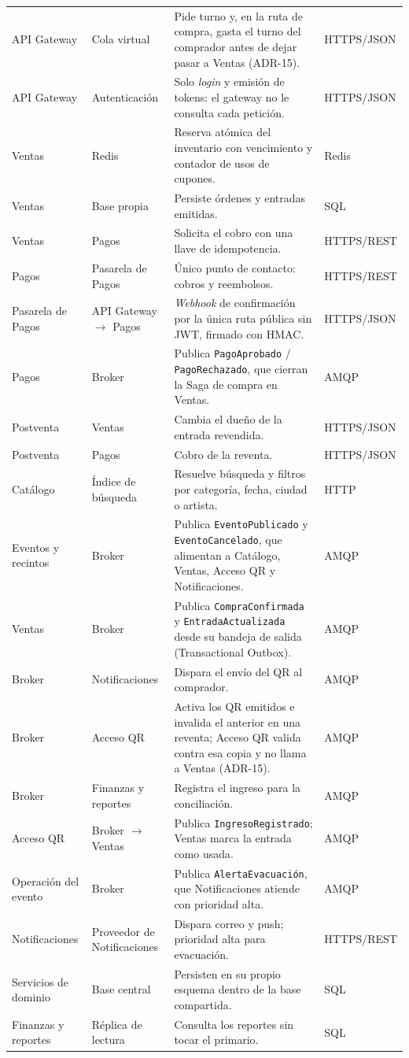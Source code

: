 \documentclass[12pt,a4paper]{article}
\begin{document}
\begin{longtable}{L{3.2cm}L{3.2cm}L{5.7cm}L{2.3cm}}
API Gateway & Cola virtual & Pide turno y, en la ruta de compra, gasta el turno del comprador antes de dejar pasar a Ventas (ADR-15). & HTTPS/JSON\\
API Gateway & Autenticación & Solo \textit{login} y emisión de tokens: el gateway no le consulta cada petición. & HTTPS/JSON\\
Ventas & Redis & Reserva atómica del inventario con vencimiento y contador de usos de cupones. & Redis\\
Ventas & Base propia & Persiste órdenes y entradas emitidas. & SQL\\
Ventas & Pagos & Solicita el cobro con una llave de idempotencia. & HTTPS/REST\\
Pagos & Pasarela de Pagos & Único punto de contacto: cobros y reembolsos. & HTTPS/REST\\
Pasarela de Pagos & API Gateway $\rightarrow$ Pagos & \textit{Webhook} de confirmación por la única ruta pública sin JWT, firmado con HMAC. & HTTPS/JSON\\
Pagos & Broker & Publica \texttt{PagoAprobado} / \texttt{PagoRechazado}, que cierran la Saga de compra en Ventas. & AMQP\\
Postventa & Ventas & Cambia el dueño de la entrada revendida. & HTTPS/JSON\\
Postventa & Pagos & Cobro de la reventa. & HTTPS/JSON\\
Catálogo & Índice de búsqueda & Resuelve búsqueda y filtros por categoría, fecha, ciudad o artista. & HTTP\\
Eventos y recintos & Broker & Publica \texttt{EventoPublicado} y \texttt{EventoCancelado}, que alimentan a Catálogo, Ventas, Acceso QR y Notificaciones. & AMQP\\
Ventas & Broker & Publica \texttt{CompraConfirmada} y \texttt{EntradaActualizada} desde su bandeja de salida (Transactional Outbox). & AMQP\\
Broker & Notificaciones & Dispara el envío del QR al comprador. & AMQP\\
Broker & Acceso QR & Activa los QR emitidos e invalida el anterior en una reventa; Acceso QR valida contra esa copia y no llama a Ventas (ADR-15). & AMQP\\
Broker & Finanzas y reportes & Registra el ingreso para la conciliación. & AMQP\\
Acceso QR & Broker $\rightarrow$ Ventas & Publica \texttt{IngresoRegistrado}; Ventas marca la entrada como usada. & AMQP\\
Operación del evento & Broker & Publica \texttt{AlertaEvacuación}, que Notificaciones atiende con prioridad alta. & AMQP\\
Notificaciones & Proveedor de Notificaciones & Dispara correo y push; prioridad alta para evacuación. & HTTPS/REST\\
Servicios de dominio & Base central & Persisten en su propio esquema dentro de la base compartida. & SQL\\
Finanzas y reportes & Réplica de lectura & Consulta los reportes sin tocar el primario. & SQL\\
\end{longtable}
\end{document}
